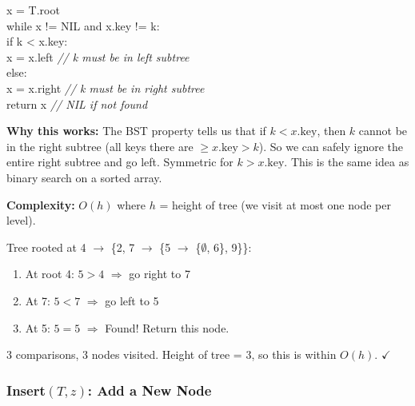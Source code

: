 \documentclass[11pt]{article}
\begin{document}
\begin{codebox}[Search(T, k)]
\ttfamily x = T.root\\
\ttfamily while x != NIL and x.key != k:\\
\ttfamily \hspace*{2em}if k < x.key:\\
\ttfamily \hspace*{4em}x = x.left \hfill\textnormal{\itshape // k must be in left subtree}\\
\ttfamily \hspace*{2em}else:\\
\ttfamily \hspace*{4em}x = x.right \hfill\textnormal{\itshape // k must be in right subtree}\\
\ttfamily return x \hfill\textnormal{\itshape // NIL if not found}
\end{codebox}

\textbf{Why this works:} The BST property tells us that if $k < x.\text{key}$, then $k$ cannot be in the right subtree (all keys there are $\geq x.\text{key} > k$). So we can safely ignore the entire right subtree and go left. Symmetric for $k > x.\text{key}$. This is the same idea as binary search on a sorted array.

\textbf{Complexity:} \textcolor{greenO}{$O(h)$} where $h$ = height of tree (we visit at most one node per level).

\begin{examplebox}
Tree rooted at 4 $\to$ \{2, 7 $\to$ \{5 $\to$ \{$\emptyset$, 6\}, 9\}\}:

\begin{enumerate}[leftmargin=1.4em,itemsep=1pt]
    \item At root 4: $5 > 4$ $\Rightarrow$ go \textcolor{rustW}{right} to 7
    \item At 7: $5 < 7$ $\Rightarrow$ go \textcolor{heapblue}{left} to 5
    \item At 5: $5 = 5$ $\Rightarrow$ \textcolor{greenO}{Found!} Return this node.
\end{enumerate}

3 comparisons, 3 nodes visited. Height of tree = 3, so this is within $O(h)$. $\checkmark$
\end{examplebox}

\subsubsection*{Insert$(T, z)$: Add a New Node}
\end{document}
